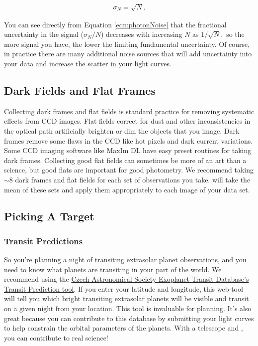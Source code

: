\documentclass{article}
\begin{document}
\begin{eqnarray}
\sigma_N = \sqrt{N}. \label{eqn:photonNoise}
\end{eqnarray}

\noindent You can see directly from Equation \ref{eqn:photonNoise} that the fractional uncertainty in the signal ($\sigma_N/N$) decreases with increasing $N$ as $1/\sqrt{N},$
so the more signal you have, the lower the limiting fundamental uncertainty. Of course, in practice there are many additional noise sources that will add uncertainty into your data and increase the scatter in your light curves. 
 
\subsection{Dark Fields and Flat Frames}

Collecting dark frames and flat fields is standard practice for removing systematic effects from CCD images. Flat fields correct for dust and other inconsistencies in the optical path artificially brighten or dim the objects that you image. Dark frames remove some flaws in the CCD like hot pixels and dark current variations. Some CCD imaging software like MaxIm DL have easy preset routines for taking dark frames. Collecting good flat fields can sometimes be more of an art than a science, but good flats are important for good photometry. We recommend taking $\sim8$ dark frames and flat fields for each set of observations you take. \oscaar will take the mean of these sets and apply them appropriately to each image of your data set. 

\subsection{Picking A Target}
\subsubsection{Transit Predictions}
So you're planning a night of transiting extrasolar planet observations, and you need to know what planets are transiting in your part of the world. We recommend using the \href{http://var2.astro.cz/ETD/predictions.php}{Czech Astronomical Society Exoplanet Transit Database's Transit Prediction tool}. If you enter your latitude and longitude, this web-tool will tell you which bright transiting extrasolar planets will be visible and transit on a given night from your location. This tool is invaluable for planning. It's also great because you can contribute to this database by submitting your light curves to help constrain the orbital parameters of the planets. With a telescope and \oscaar, you can contribute to real science!
\end{document}
